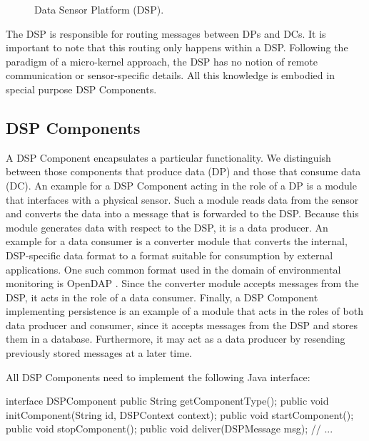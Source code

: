 \documentclass[conference]{IEEEtran}
\begin{document}
\begin{figure}
\centering
{}
\caption{\label{FIG_DSP} Data Sensor Platform (DSP).}
\end{figure}

The DSP is responsible for routing messages between DPs and DCs. It is
important to note that this routing only happens within a
DSP. Following the paradigm of a micro-kernel approach, the DSP has no
notion of remote communication or sensor-specific details. All this
knowledge is embodied in special purpose DSP Components.

\subsection{DSP Components}

A DSP Component encapsulates a particular functionality. We
distinguish between those components that produce data (DP) and those
that consume data (DC). An example for a DSP Component acting in the
role of a DP is a module that interfaces with a physical sensor. Such
a module reads data from the sensor and converts the data into a
message that is forwarded to the DSP. Because this module generates
data with respect to the DSP, it is a data producer. An example for a
data consumer is a converter module that converts the internal,
DSP-specific data format to a format suitable for consumption by
external applications. One such common format used in the domain of
environmental monitoring is OpenDAP \cite{opendap01}.  Since the
converter module accepts messages from the DSP, it acts in the role of
a data consumer. Finally, a DSP Component implementing persistence is
an example of a module that acts in the roles of both data producer
and consumer, since it accepts messages from the DSP and stores them in a
database. Furthermore, it may act as a data producer by resending previously
stored messages at a later time.

All DSP Components need to implement the following Java interface:

\begin{code}
interface DSPComponent
{
   public String getComponentType();
   public void initComponent(String     id, 
                             DSPContext context);
   public void startComponent();
   public void stopComponent();
   public void deliver(DSPMessage msg);
   // ...
}
\end{code}
\end{document}
